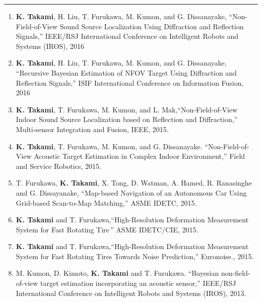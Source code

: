 \documentclass[10pt,letterpaper]{article}
\newcommand{\sect}[1]{\vspace{3mm}{\centering {\bf \large \scshape \uppercase{#1}} \par}  {\color{blue} \vskip 2mm \hrule height 1pt}\vspace{2mm}}
\begin{document}
\sect{Selected Conference papers and workshop}
\begin{enumerate}
	\item {\bf K. Takami}, H. Liu, T. Furukawa, M. Kumon, and G. Dissanayake, ``Non-Field-of-View Sound Source Localization	Using Diffraction and Reflection Signals,'' IEEE/RSJ International Conference on Intelligent Robots and Systems (IROS), 2016
  \item {\bf K. Takami}, H. Liu, T. Furukawa, M. Kumon, and G. Dissanayake, ``Recursive Bayesian Estimation of NFOV Target Using Diffraction and Reflection Signals,'' ISIF International Conference on Information Fusion, 2016
  \item  {\bf K. Takami}, T. Furukawa, M. Kumon, and L. Mak,``Non-Field-of-View Indoor Sound Source Localization based on Reflection and Diffraction,'' Multi-sensor Integration and Fusion, IEEE, 2015.
  \item {\bf K. Takami}, T. Furukawa, M. Kumon, and G. Dissanayake. ``Non-Field-of-View Acoustic Target Estimation in Complex Indoor Environment,'' Field and Service Robotics, 2015.
  \item  T. Furukawa, {\bf K. Takami}, X. Tong, D. Watman, A. Hamed, R. Ranasinghe and G. Dissayanake, ``Map-based Navigation of an Autonomous Car Using Grid-based Scan-to-Map Matching,'' ASME IDETC, 2015.
  \item  {\bf K. Takami} and T. Furukawa,``High-Resolution Deformation Measurement System for Fast Rotating Tire\,'' ASME IDETC/CIE, 2015.


  \item  {\bf K. Takami} and T. Furukawa,``High-Resolution Deformation Measurement System for Fast Rotating Tires Towards Noise Prediction,'' Euronoise., 2015.
  \iftoggle{resume}{}{

  \item M. Kumon, D. Kimoto, {\bf K. Takami} and T. Furukawa, ``Acoustic recursive Bayesian estimation for non-field-of-view targets,'' In Image Analysis for Multimedia Interactive Services (WIAMIS), IEEE, 2013.
}
  \item M. Kumon, D. Kimoto, {\bf K. Takami} and T. Furukawa. ``Bayesian non-field-of-view target estimation incorporating an acoustic sensor,'' IEEE/RSJ International Conference on Intelligent Robots and Systems  (IROS), 2013.
  \iftoggle{resume}{}{

  \item {\bf K. Takami}, S. Taheri, M. Taheri and T. Furukawa, ``Prediction of Railroad Track Foundation Defects Using Wavelets,'' Joint Rail Conference, ASME, 2013.
  }
\end{enumerate}
\end{document}
